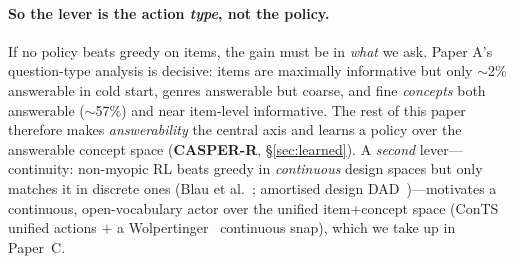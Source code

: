 \documentclass[11pt]{article}
\begin{document}
\paragraph{So the lever is the action \emph{type}, not the policy.} If no policy beats greedy on items, the gain must be
in \emph{what} we ask. Paper A's question-type analysis is decisive: items are maximally informative but only $\sim$2\%
answerable in cold start, genres answerable but coarse, and fine \emph{concepts} both answerable ($\sim$57\%) and
near item-level informative. The rest of this paper therefore makes \emph{answerability} the central axis and learns a
policy over the answerable concept space (\textbf{CASPER-R}, \S\ref{sec:learned}). A \emph{second} lever---continuity:
non-myopic RL beats greedy in \emph{continuous} design spaces but only matches it in discrete ones (Blau et
al.~\cite{blau22}; amortised design DAD~\cite{dad})---motivates a continuous, open-vocabulary actor over the unified
item$+$concept space (ConTS~\cite{conts} unified actions $+$ a Wolpertinger~\cite{wolp} continuous snap), which we take
up in Paper~C.
\end{document}
